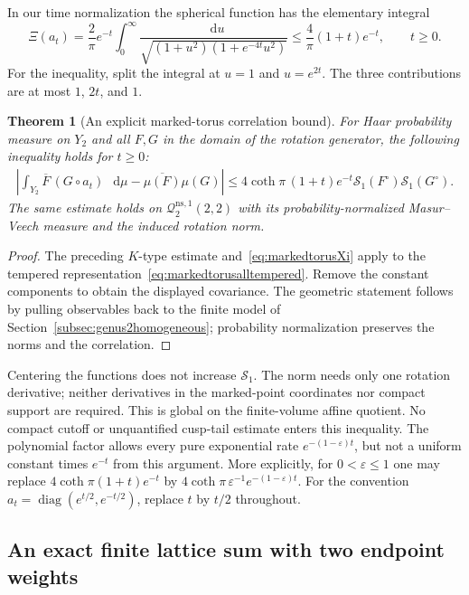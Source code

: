 \documentclass[11pt,a4paper]{article}
\numberwithin{equation}{section}
\newtheorem{theorem}{Theorem}[section]
\theoremstyle{definition}
\theoremstyle{remark}
\DeclareMathOperator{\diag}{diag}
\newcommand{\dd}{\mathop{}\!\mathrm d}
\begin{document}
In our time normalization the spherical function has the elementary
integral
\begin{equation}
 \Xi(a_t)=\frac2\pi e^{-t}
   \int_0^\infty
    \frac{\dd u}{\sqrt{(1+u^2)(1+e^{-4t}u^2)}}
 \leq\frac4\pi(1+t)e^{-t},\qquad t\geq0.
 \label{eq:markedtorusXi}
\end{equation}
For the inequality, split the integral at $u=1$ and $u=e^{2t}$.
The three contributions are at most $1$, $2t$, and $1$.
\begin{theorem}[An explicit marked-torus correlation bound]
\label{thm:markedtorusmixing}
For Haar probability measure on $Y_2$ and all $F,G$ in the domain
of the rotation generator, the following inequality holds for $t\geq0$:
\begin{equation}
 \begin{split}
 \left|\int_{Y_2}\overline F\,(G\circ a_t)\,\dd\mu
       -\overline{\mu(F)}\mu(G)\right|
 \leq4\coth\pi\,(1+t)e^{-t}
       \mathcal S_1(F^\circ)\mathcal S_1(G^\circ).
 \end{split}
 \label{eq:markedtorusexplicitmix}
\end{equation}
The same estimate holds on $\mathcal Q^{\mathrm{ns},1}_2(2,2)$
with its probability-normalized Masur--Veech measure and the induced
rotation norm.
\end{theorem}
\begin{proof}
The preceding $K$-type estimate and~\eqref{eq:markedtorusXi} apply
to the tempered representation~\eqref{eq:markedtorusalltempered}.
Remove the constant components to obtain the displayed covariance.
The geometric statement follows by pulling observables back to the
finite model of Section~\ref{subsec:genus2homogeneous}; probability
normalization preserves the norms and the correlation.
\end{proof}
Centering the functions does not increase $\mathcal S_1$.
The norm needs only one rotation derivative; neither derivatives in
the marked-point coordinates nor compact support are required.
This is global on the finite-volume affine quotient. No compact
cutoff or unquantified cusp-tail estimate enters this inequality.
The polynomial factor allows every pure exponential rate
$e^{-(1-\varepsilon)t}$, but not a uniform constant times $e^{-t}$
from this argument. More explicitly, for $0<\varepsilon\leq1$ one
may replace $4\coth\pi(1+t)e^{-t}$ by
$4\coth\pi\,\varepsilon^{-1}e^{-(1-\varepsilon)t}$.
For the convention $a_t=\diag(e^{t/2},e^{-t/2})$, replace $t$
by $t/2$ throughout.

\subsection{An exact finite lattice sum with two endpoint weights}
\end{document}
